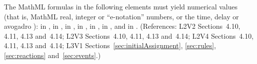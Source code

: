 The MathML formulas in the following elements must yield numerical
values (that is, MathML real, integer or ``e-notation'' numbers,
or the time, delay or avogadro ):  in \KineticLaw,
 in
\InitialAssignment,  in \AssignmentRule,  in
\RateRule,  in \AlgebraicRule,  in \Event
\Delay, and  in \EventAssignment.  (References: L2V2
Sections~4.10, 4.11, 4.13 and~4.14; L2V3 Sections~4.10, 4.11, 4.13 
and~4.14; L2V4 Sections~4.10, 4.11, 4.13 and~4.14; L3V1 
Sections~\ref{sec:initialAssignment}, \ref{sec:rules}, 
\ref{sec:reactions} and~\ref{sec:events}.)


